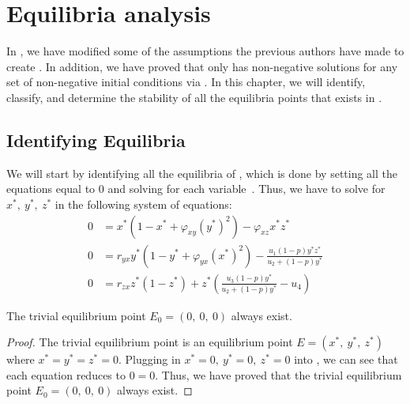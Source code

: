 
\chapter{Equilibria analysis}\label{ch:equilibria-analysis}
In , we have modified some of the assumptions the previous authors have made to create . In addition, we have proved that  only has non-negative solutions for any set of non-negative initial conditions via . In this chapter, we will identify, classify, and determine the stability of all the equilibria points that exists in . 

\section{Identifying Equilibria}\label{sec:identifying-equilibria}
We will start by identifying all the equilibria of , which is done by setting all the equations equal to 0 and solving for each variable~\cite{Strogatz9780813349107}. Thus, we have to solve for $x^*,\ y^*,\ z^*$ in the following system of equations:
\begin{subequations}\label{system:model-0}
    \begin{align}
        0 &= x^*\left(1-x^*+\varphi_{xy}\left(y^*\right)^2\right)-\varphi_{xz}x^*z^* \label{eq:model-0-x}\\
        0 &= r_{yx}y^*\left(1-y^*+\varphi_{yx}\left(x^*\right)^2\right)-\frac{u_1\left(1-p\right)y^*z^*}{u_2+\left(1-p\right)y^*} \label{eq:model-0-y}\\
        0 &= r_{zx}z^*\left(1-z^*\right)+z^*\left(\frac{u_3\left(1-p\right)y^*}{u_2+\left(1-p\right)y^*}-u_4\right) \label{eq:model-0-z}
    \end{align}
\end{subequations}

\begin{theorem}\label{thm:trivial-exist}
    The trivial equilibrium point $E_0=\left(0,\ 0,\ 0\right)$ always exist.
\end{theorem}
\begin{proof}
    The trivial equilibrium point is an equilibrium point $E=\left(x^*,\ y^*,\ z^*\right)$ where $x^*=y^*=z^*=0$. Plugging in $x^*=0,\ y^*=0,\ z^*=0$ into , we can see that each equation reduces to $0=0$. Thus, we have proved that the trivial equilibrium point $E_0=\left(0,\ 0,\ 0\right)$ always exist.
\end{proof}

